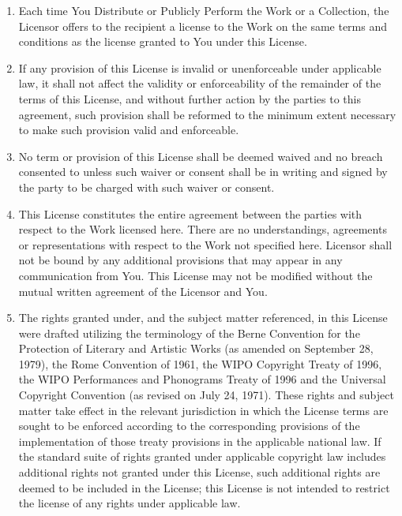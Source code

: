 \begin{enumerate}
\item Each time You Distribute or Publicly Perform the Work
or a Collection, the Licensor offers to the recipient a
license to the Work on the same terms and conditions as
the license granted to You under this License.
\item If any provision of this License is invalid or
unenforceable under applicable law, it shall not affect
the validity or enforceability of the remainder of the
terms of this License, and without further action by the
parties to this agreement, such provision shall be
reformed to the minimum extent necessary to make such
provision valid and enforceable.
\item No term or provision of this License shall be deemed
waived and no breach consented to unless such waiver or
consent shall be in writing and signed by the party to be
charged with such waiver or consent.
\item This License constitutes the entire agreement between
the parties with respect to the Work licensed here. There
are no understandings, agreements or representations with
respect to the Work not specified here. Licensor shall
not be bound by any additional provisions that may appear
in any communication from You. This License may not be
modified without the mutual written agreement of the
Licensor and You.
\item The rights granted under, and the subject matter
referenced, in this License were drafted utilizing the
terminology of the Berne Convention for the Protection of
Literary and Artistic Works (as amended on September 28,
1979), the Rome Convention of 1961, the WIPO Copyright
Treaty of 1996, the WIPO Performances and Phonograms
Treaty of 1996 and the Universal Copyright Convention (as
revised on July 24, 1971). These rights and subject
matter take effect in the relevant jurisdiction in which
the License terms are sought to be enforced according to
the corresponding provisions of the implementation of
those treaty provisions in the applicable national law.
If the standard suite of rights granted under applicable
copyright law includes additional rights not granted
under this License, such additional rights are deemed to
be included in the License; this License is not intended
to restrict the license of any rights under applicable
law.
\end{enumerate}
 
